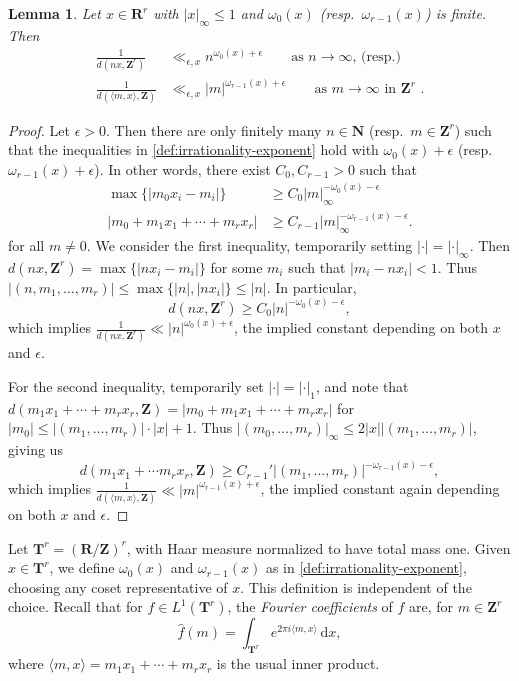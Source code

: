 \documentclass{article}
\newcommand{\bN}{\mathbf{N}}
\newcommand{\bR}{\mathbf{R}}
\newcommand{\bT}{\mathbf{T}}
\newcommand{\bZ}{\mathbf{Z}}
\newcommand{\dd}{\mathrm{d}}
\newtheorem{lemma}[subsection]{Lemma}
\theoremstyle{definition}
\begin{document}
\begin{lemma}\label{lem:distance-asymptotic}
Let $x\in \bR^r$ with $|x|_\infty\leqslant 1$ and $\omega_0(x)$
(resp.~$\omega_{r-1}(x)$) is finite. Then 
\begin{align*}
	\frac{1}{d(n x,\bZ^r)} &\ll_{\epsilon,x} n^{\omega_0(x)+\epsilon} \qquad \text{as $n\to \infty$, (resp.)}\\
	\frac{1}{d(\langle m,x\rangle,\bZ)} &\ll_{\epsilon,x} |m|^{\omega_{r-1}(x)+\epsilon}\qquad \text{as $m\to \infty$ in $\bZ^r$ .}
\end{align*}
\end{lemma}
\begin{proof}
Let $\epsilon>0$. Then there are only finitely many $n\in \bN$ 
(resp.~$m\in \bZ^r$) such that the inequalities in 
\autoref{def:irrationality-exponent} hold with $\omega_0(x)+\epsilon$ 
(resp.~$\omega_{r-1}(x)+\epsilon$). In other words, there exist 
$C_0,C_{r-1}>0$ such that 
\begin{align*}
	\max\{|m_0 x_i - m_i|\} &\geqslant C_0 |m|_\infty^{-\omega_0(x)-\epsilon} \\
	|m_0 + m_1 x_1 + \cdots + m_r x_r| &\geqslant C_{r-1} |m|_\infty^{-\omega_{r-1}(x)-\epsilon} .
\end{align*}
for all $m\ne 0$. We consider the first inequality, temporarily setting 
$|\cdot|=|\cdot|_\infty$. Then $d(n x,\bZ^r)=\max\{|n x_i-m_i|\}$ for some 
$m_i$ such that $|m_i-n x_i|< 1$. Thus 
$|(n,m_1,\dots,m_r)| \leqslant \max\{|n|,|n x_i|\}\leqslant |n|$. In 
particular, 
\[
	d(nx,\bZ^r) \geqslant C_0 |n|^{-\omega_0(x)-\epsilon} ,
\]
which implies $\frac{1}{d(n x,\bZ^r)} \ll |n|^{\omega_0(x)+\epsilon}$, the 
implied constant depending on both $x$ and $\epsilon$. 

For the second inequality, temporarily set $|\cdot|=|\cdot|_1$, and note that 
$d(m_1 x_1+\cdots+m_r x_r,\bZ)=|m_0+m_1 x_1+\cdots + m_r x_r|$ for 
$|m_0| \leqslant |(m_1,\dots,m_r)|\cdot |x|+1$. Thus 
$|(m_0,\dots,m_r)|_\infty \leqslant 2 |x| |(m_1,\dots,m_r)|$, giving us 
\[
	d(m_1x_1 + \cdots m_r x_r,\bZ) \geqslant C_{r-1}' |(m_1,\dots,m_r)|^{-\omega_{r-1}(x)-\epsilon} ,
\]
which implies $\frac{1}{d(\langle m,x\rangle,\bZ)} \ll |m|^{\omega_{r-1}(x)+\epsilon}$, 
the implied constant again depending on both $x$ and $\epsilon$. 
\end{proof}

Let $\bT^r=(\bR/\bZ)^r$, with Haar measure normalized to have total mass one. 
Given $x\in \bT^r$, we define $\omega_0(x)$ and $\omega_{r-1}(x)$ as in 
\autoref{def:irrationality-exponent}, choosing any coset representative of $x$. 
This definition is independent of the choice. Recall that for 
$f\in L^1(\bT^r)$, the \emph{Fourier coefficients} of $f$ are, for $m\in \bZ^r$ 
\[
	\widehat f(m) = \int_{\bT^r} e^{2\pi i \langle m,x\rangle}\, \dd x ,
\]
where $\langle m,x\rangle=m_1 x_1 + \cdots + m_r x_r$ is the usual inner 
product. 
\end{document}
